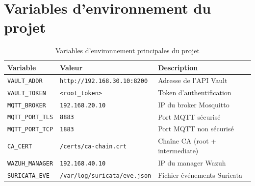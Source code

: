 \section{Variables d'environnement du projet}
\label{sec:config_env}

\begin{table}[H]
\centering
\caption{Variables d'environnement principales du projet}
\label{tab:env_vars}
\begin{tabular}{|l|l|p{6cm}|}
\hline
\textbf{Variable} & \textbf{Valeur} & \textbf{Description} \\
\hline
\texttt{VAULT\_ADDR} & \texttt{http://192.168.30.10:8200} & Adresse de l'API Vault \\ \hline
\texttt{VAULT\_TOKEN} & \texttt{<root\_token>} & Token d'authentification \\ \hline
\texttt{MQTT\_BROKER} & \texttt{192.168.20.10} & IP du broker Mosquitto \\ \hline
\texttt{MQTT\_PORT\_TLS} & \texttt{8883} & Port MQTT sécurisé \\ \hline
\texttt{MQTT\_PORT\_TCP} & \texttt{1883} & Port MQTT non sécurisé \\ \hline
\texttt{CA\_CERT} & \texttt{/certs/ca-chain.crt} & Chaîne CA (root + intermediate) \\ \hline
\texttt{WAZUH\_MANAGER} & \texttt{192.168.40.10} & IP du manager Wazuh \\ \hline
\texttt{SURICATA\_EVE} & \texttt{/var/log/suricata/eve.json} & Fichier événements Suricata \\ \hline
\end{tabular}
\end{table}
